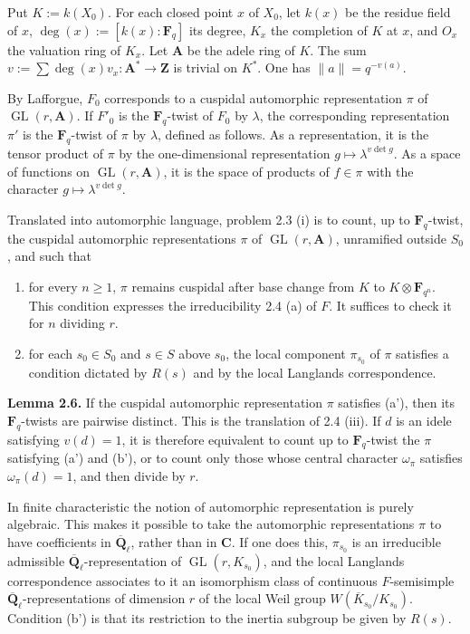 \documentclass[11pt]{article}
\newcommand{\Qbar}{\overline{\mathbf Q}}
\newcommand{\Fq}{\mathbf F_q}
\newcommand{\Z}{\mathbf Z}
\newcommand{\A}{\mathbf A}
\newcommand{\GL}{\operatorname{GL}}
\begin{document}
Put \(K:=k(X_0)\). For each closed point \(x\) of \(X_0\), let \(k(x)\) be the residue field of \(x\), \(\deg(x):=[k(x):\Fq]\) its degree, \(K_x\) the completion of \(K\) at \(x\), and \(O_x\) the valuation ring of \(K_x\). Let \(\A\) be the adele ring of \(K\). The sum \(v:=\sum \deg(x)v_x:\A^*\to \Z\) is trivial on \(K^*\). One has \(\|a\|=q^{-v(a)}\).

By Lafforgue, \(F_0\) corresponds to a cuspidal automorphic representation \(\pi\) of \(\GL(r,\A)\). If \(F'_0\) is the \(\Fq\)-twist of \(F_0\) by \(\lambda\), the corresponding representation \(\pi'\) is the \(\Fq\)-twist of \(\pi\) by \(\lambda\), defined as follows. As a representation, it is the tensor product of \(\pi\) by the one-dimensional representation \(g\mapsto \lambda^{v\det g}\). As a space of functions on \(\GL(r,\A)\), it is the space of products of \(f\in\pi\) with the character \(g\mapsto \lambda^{v\det g}\).

Translated into automorphic language, problem 2.3 (i) is to count, up to \(\Fq\)-twist, the cuspidal automorphic representations \(\pi\) of \(\GL(r,\A)\), unramified outside \(S_0\), and such that
\begin{enumerate}[label=(\alph*')]
\item for every \(n\ge 1\), \(\pi\) remains cuspidal after base change from \(K\) to \(K\otimes \mathbf F_{q^n}\). This condition expresses the irreducibility 2.4 (a) of \(F\). It suffices to check it for \(n\) dividing \(r\).
\item for each \(s_0\in S_0\) and \(s\in S\) above \(s_0\), the local component \(\pi_{s_0}\) of \(\pi\) satisfies a condition dictated by \(R(s)\) and by the local Langlands correspondence.
\end{enumerate}
\textbf{Lemma 2.6.} If the cuspidal automorphic representation \(\pi\) satisfies (a'), then its \(\Fq\)-twists are pairwise distinct.
This is the translation of 2.4 (iii). If \(d\) is an idele satisfying \(v(d)=1\), it is therefore equivalent to count up to \(\Fq\)-twist the \(\pi\) satisfying (a') and (b'), or to count only those whose central character \(\omega_\pi\) satisfies \(\omega_\pi(d)=1\), and then divide by \(r\).

In finite characteristic the notion of automorphic representation is purely algebraic. This makes it possible to take the automorphic representations \(\pi\) to have coefficients in \(\Qbar_\ell\), rather than in \(\mathbf C\). If one does this, \(\pi_{s_0}\) is an irreducible admissible \(\Qbar_\ell\)-representation of \(\GL(r,K_{s_0})\), and the local Langlands correspondence associates to it an isomorphism class of continuous \(F\)-semisimple \(\Qbar_\ell\)-representations of dimension \(r\) of the local Weil group \(W(\overline K_{s_0}/K_{s_0})\). Condition (b') is that its restriction to the inertia subgroup be given by \(R(s)\).
\end{document}
